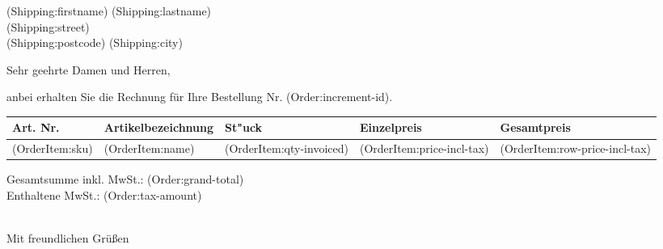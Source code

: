 \documentclass[DIN, pagenumber=false, parskip=half,%
               fromalign=right, fromphone=true, fromfax=true,
               fromrule=false]{scrlttr2}
\begin{document}
 

\begin{letter}{(Shipping:firstname) (Shipping:lastname) \\ (Shipping:street) \\ (Shipping:postcode) (Shipping:city)}

\opening{Sehr geehrte Damen und Herren,}

anbei erhalten Sie die Rechnung für Ihre Bestellung Nr. (Order:increment-id). \\


\begin{longtable}{p{2.5cm}p{6.5cm}p{2cm}p{2cm}p{2cm}}

\hline 	
Art. Nr. & Artikelbezeichnung & St"uck & Einzelpreis & Gesamtpreis\\
\hline 
(OrderItem:sku) & (OrderItem:name) & (OrderItem:qty-invoiced) &(OrderItem:price-incl-tax) & (OrderItem:row-price-incl-tax)\\
\hline 
\hline 
\end{longtable}
Gesamtsumme inkl. MwSt.: (Order:grand-total) \\
Enthaltene MwSt.: (Order:tax-amount) \\



\closing{\\ Mit freundlichen Grüßen}
\end{letter}
 
\end{document}
